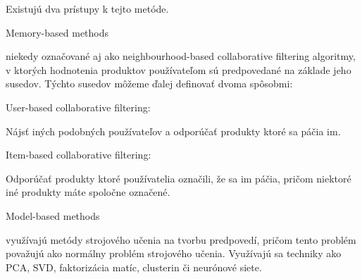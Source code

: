 Existujú dva prístupy k tejto metóde.

\begin{enumerate}
	{\bf \item Memory-based methods} niekedy označované aj ako neighbourhood-based collaborative filtering algoritmy, v ktorých hodnotenia produktov používateľom sú predpovedané na základe jeho susedov. Týchto susedov môžeme ďalej definovať dvoma spôsobmi:
\begin{itemize}[leftmargin=*]
	{\bf \item User-based collaborative filtering:}\newline
Nájsť iných podobných používateľov a odporúčať produkty ktoré sa páčia im.
	{\bf \item Item-based collaborative filtering:}\newline
Odporúčať produkty ktoré používatelia označili, že sa im páčia, pričom niektoré iné produkty máte spoločne označené.
\end{itemize}
	{\bf \item Model-based methods} využívajú metódy strojového učenia na tvorbu predpovedí, pričom tento problém považujú ako normálny problém strojového učenia. Využívajú sa techniky ako PCA, SVD, faktorizácia matíc, clusterin či neurónové siete.
\end{enumerate}
 
